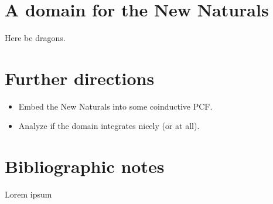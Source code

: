 \documentclass[a4paper]{article}
\begin{document}
\section{A domain for the New Naturals}

Here be dragons.

\section{Further directions}

\begin{itemize}
\item Embed the New Naturals into some coinductive PCF.
\item Analyze if the domain integrates nicely (or at all).
\end{itemize}

\section{Bibliographic notes}

Lorem ipsum \cite{Pierce1991} \cite{Gunter1992} \cite{Bird1997}
\cite{Mitchell1996} \cite{Allison1986} \cite{Capretta2002}



\end{document}
